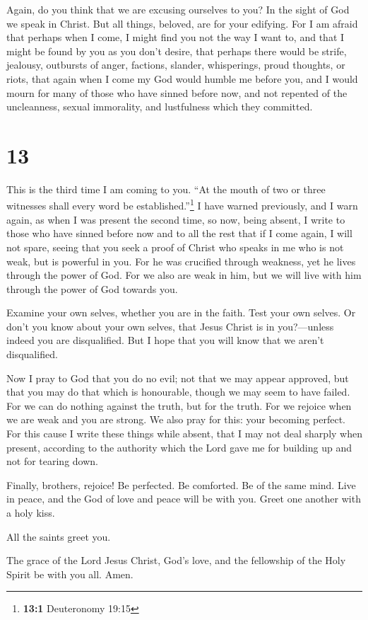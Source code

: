  Again, do you think that we are excusing ourselves to
you? In the sight of God we speak in Christ. But all things, beloved,
are for your edifying.  For I am afraid that perhaps when
I come, I might find you not the way I want to, and that I might be
found by you as you don't desire, that perhaps there would be strife,
jealousy, outbursts of anger, factions, slander, whisperings, proud
thoughts, or riots,  that again when I come my God would
humble me before you, and I would mourn for many of those who have
sinned before now, and not repented of the uncleanness, sexual
immorality, and lustfulness which they committed.

\hypertarget{section-12}{%
\section{13}\label{section-12}}

 This is the third time I am coming to you. ``At the mouth
of two or three witnesses shall every word be established.''\footnote{\textbf{13:1}
  Deuteronomy 19:15}  I have warned previously, and I warn
again, as when I was present the second time, so now, being absent, I
write to those who have sinned before now and to all the rest that if I
come again, I will not spare,  seeing that you seek a
proof of Christ who speaks in me who is not weak, but is powerful in
you.  For he was crucified through weakness, yet he lives
through the power of God. For we also are weak in him, but we will live
with him through the power of God towards you.

 Examine your own selves, whether you are in the faith.
Test your own selves. Or don't you know about your own selves, that
Jesus Christ is in you?---unless indeed you are disqualified.
 But I hope that you will know that we aren't
disqualified.

 Now I pray to God that you do no evil; not that we may
appear approved, but that you may do that which is honourable, though we
may seem to have failed.  For we can do nothing against
the truth, but for the truth.  For we rejoice when we are
weak and you are strong. We also pray for this: your becoming perfect.
 For this cause I write these things while absent, that I
may not deal sharply when present, according to the authority which the
Lord gave me for building up and not for tearing down.

 Finally, brothers, rejoice! Be perfected. Be comforted.
Be of the same mind. Live in peace, and the God of love and peace will
be with you.  Greet one another with a holy kiss.

 All the saints greet you.

 The grace of the Lord Jesus Christ, God's love, and the
fellowship of the Holy Spirit be with you all. Amen.

